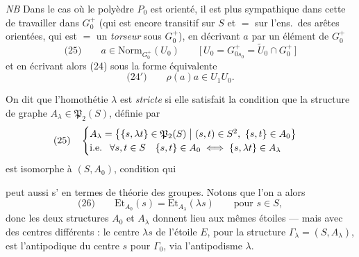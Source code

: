 \documentclass[11pt,a4paper]{article}
\begin{document}
\emph{NB} Dans le cas où le polyèdre $P_0$ est orienté, il est plus sympathique
dans cette  de travailler dans $G_0^{+}$ (qui est encore
transitif sur $S$ et $=$ sur l'ens.\ des arêtes orientées, qui
est $=$ un \emph{torseur} sous $G_0^{+}$), en décrivant
$a$ par un élément de $G_0^{+}$
\[
\text{(25)} \qquad a \in \mathrm{Norm}_{G_0^{+}}(U_0)
\qquad \bigl[\, U_0 = G^{+}_{0 s_0} = \widetilde{U}_0 \cap G_0^{+} \,\bigr]
\]
et en écrivant  alors (24)  sous la forme
équivalente
\[
\text{(24$'$)} \qquad \rho(a) a \in U_1 U_0 .
\]

On dit que l'homothétie $\lambda$ est \emph{stricte} si elle satisfait la
condition que la structure de graphe  $A_\lambda \in \mathfrak{P}_2(S)$,
définie par
\[
\text{(25)} \quad
\begin{cases}
A_\lambda = \bigl\{ \{s, \lambda t\} \in \mathfrak{P}_2(S) \bigm| (s,t) \in S^2 ,\ \{s,t\} \in A_0 \bigr\} \\
\text{i.e. } \ \forall s,t \in S \quad \{s,t\} \in A_0 \iff \{s, \lambda t\} \in A_\lambda
\end{cases}
\]
est isomorphe à $(S, A_0)$, \struck{\ill{}} condition qui

peut aussi s'  en termes de théorie des groupes.
Notons que l'on a alors
\[
\text{(26)} \qquad \mathrm{Et}_{A_0}(s) = \mathrm{Et}_{A_\lambda}(\lambda s)
\qquad \text{pour } s \in S ,
\]
donc les deux structures $A_0$ et $A_\lambda$ donnent lieu aux mêmes étoiles —
mais avec des centres différents : le centre $\lambda s$ de l'étoile $E$, pour
la structure $\Gamma_\lambda = (S, A_\lambda)$, est l'antipodique du centre $s$
pour $\Gamma_0$, via l'antipodisme $\lambda$.
\end{document}
